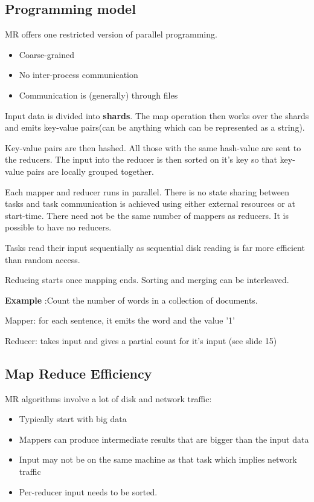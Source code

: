 \documentclass[11pt]{article}
\begin{document}
\subsection{Programming model}
MR offers one restricted version of parallel programming.

\begin{itemize}
\item Coarse-grained
\item No inter-process communication
\item Communication is (generally) through files
\end{itemize}

Input data is divided into \textbf{shards}. The map operation then works over the shards and emits key-value pairs(can be anything which can be represented as a string). 

Key-value pairs are then hashed. All those with the same hash-value are sent to the reducers. The input into the reducer is then sorted on it's key so that key-value pairs are locally grouped together.

Each mapper and reducer runs in parallel\cite{ques}. There is no state sharing between tasks and task communication is achieved using either external resources or at start-time. There need not be the same number of mappers as reducers. It is possible to have no reducers.

Tasks read their input sequentially as sequential disk reading is far more efficient than random access.

Reducing starts once mapping ends. Sorting and merging can be interleaved.

\begin{center}
\textbf{Example} :Count the number of words in a collection of documents.

Mapper: for each sentence, it emits the word and the value '1' 

Reducer: takes input and gives a partial count for it's input (see slide 15)

\end{center}

\subsection{Map Reduce Efficiency}

MR algorithms involve a lot of disk and network traffic:

\begin{itemize}
\item Typically start with big data
\item Mappers can produce intermediate results that are bigger than the input data
\item Input may not be on the same machine as that task which implies network traffic
\item Per-reducer input needs to be sorted.
\end{itemize}
\end{document}
